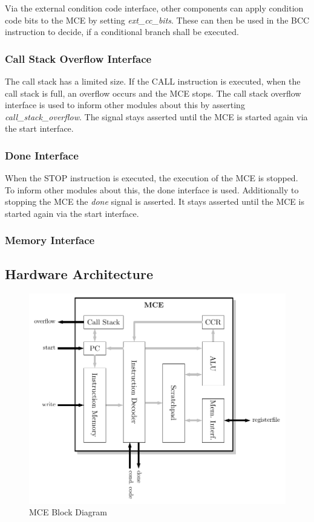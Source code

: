 Via the external condition code interface, other components can apply condition code bits to the MCE by setting \emph{ext_cc_bits}.
These can then be used in the BCC instruction to decide, if a conditional branch shall be executed.

\subsubsection{Call Stack Overflow Interface}

The call stack has a limited size.
If the CALL instruction is executed, when the call stack is full, an overflow occurs and the MCE stops.
The call stack overflow interface is used to inform other modules about this by asserting \emph{call\_stack\_overflow}.
The signal stays asserted until the MCE is started again via the start interface.

\subsubsection{Done Interface}

When the STOP instruction is executed, the execution of the MCE is stopped.
To inform other modules about this, the done interface is used.
Additionally to stopping the MCE the \emph{done} signal is asserted.
It stays asserted until the MCE is started again via the start interface.

\subsubsection{Memory Interface}



\subsection{Hardware Architecture}



\begin{figure}[htb]
 \centering
 \includegraphics[scale=1.0]{images/mce_block}
 \caption{MCE Block Diagram}
\label{fig:mce_block}
\end{figure}

